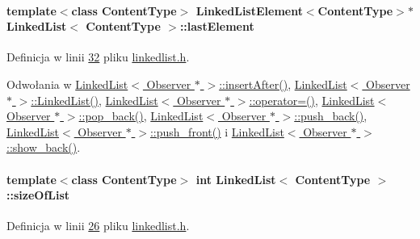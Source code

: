 \hypertarget{class_linked_list_a8ca0cc6c38131c17f1626bb04a472fc9}{
\paragraph[{last\-Element}]{\setlength{\rightskip}{0pt plus 5cm}template$<$class Content\-Type$>$ {\bf Linked\-List\-Element}$<$Content\-Type$>$$\ast$ {\bf Linked\-List}$<$ Content\-Type $>$\-::last\-Element}}\label{class_linked_list_a8ca0cc6c38131c17f1626bb04a472fc9}


Definicja w linii \hyperlink{linkedlist_8h_source_l00032}{32} pliku \hyperlink{linkedlist_8h_source}{linkedlist.\-h}.



Odwołania w \hyperlink{linkedlist_8h_source_l00238}{Linked\-List$<$ Observer $\ast$ $>$\-::insert\-After()}, \hyperlink{linkedlist_8h_source_l00038}{Linked\-List$<$ Observer $\ast$ $>$\-::\-Linked\-List()}, \hyperlink{linkedlist_8h_source_l00262}{Linked\-List$<$ Observer $\ast$ $>$\-::operator=()}, \hyperlink{linkedlist_8h_source_l00073}{Linked\-List$<$ Observer $\ast$ $>$\-::pop\-\_\-back()}, \hyperlink{linkedlist_8h_source_l00100}{Linked\-List$<$ Observer $\ast$ $>$\-::push\-\_\-back()}, \hyperlink{linkedlist_8h_source_l00113}{Linked\-List$<$ Observer $\ast$ $>$\-::push\-\_\-front()} i \hyperlink{linkedlist_8h_source_l00135}{Linked\-List$<$ Observer $\ast$ $>$\-::show\-\_\-back()}.

\hypertarget{class_linked_list_acfd83fe531d962d6260a633dfca98a9f}{
\paragraph[{size\-Of\-List}]{\setlength{\rightskip}{0pt plus 5cm}template$<$class Content\-Type$>$ int {\bf Linked\-List}$<$ Content\-Type $>$\-::size\-Of\-List}}\label{class_linked_list_acfd83fe531d962d6260a633dfca98a9f}


Definicja w linii \hyperlink{linkedlist_8h_source_l00026}{26} pliku \hyperlink{linkedlist_8h_source}{linkedlist.\-h}.



